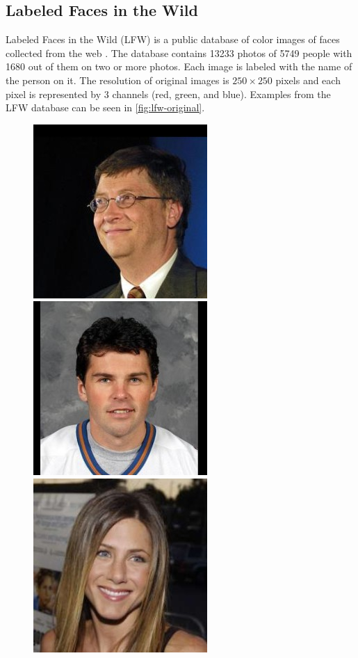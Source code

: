 \newpage
\subsection*{\label{sec:lfw-database}Labeled Faces in the Wild}
Labeled Faces in the Wild (LFW) is a public database of color images of faces collected from the web \cite{LFWTech}. The database contains 13233 photos of 5749 people with 1680 out of them on two or more photos. Each image is labeled with the name of the person on it. The resolution of original images is $250 \times 250$ pixels and each pixel is represented by 3 channels (red, green, and blue). Examples from the LFW database can be seen in \autoref{fig:lfw-original}.

\begin{figure}[!h]
    \centering
    \includegraphics[scale=0.4]{figures/lfw/original_Bill_Gates_0002.jpg}
    \includegraphics[scale=0.4]{figures/lfw/original_Jaromir_Jagr_0001.jpg}
    \includegraphics[scale=0.4]{figures/lfw/original_Jennifer_Aniston_0015.jpg}

\end{figure}
